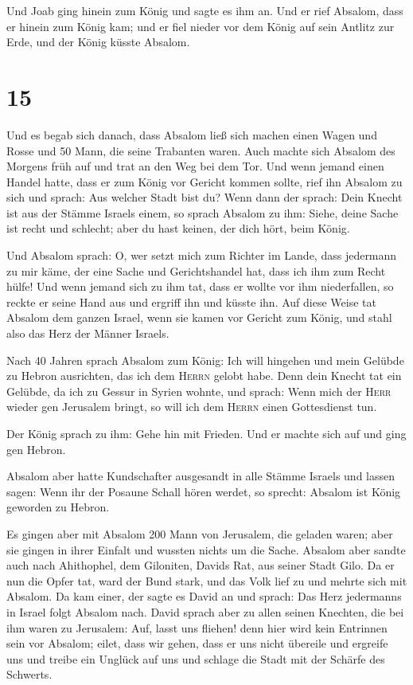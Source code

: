  Und Joab ging hinein zum König und sagte es ihm an. Und
er rief Absalom, dass er hinein zum König kam; und er fiel nieder vor
dem König auf sein Antlitz zur Erde, und der König küsste Absalom.

\hypertarget{section-14}{%
\section{15}\label{section-14}}

 Und es begab sich danach, dass Absalom ließ sich machen
einen Wagen und Rosse und 50 Mann, die seine Trabanten waren.
 Auch machte sich Absalom des Morgens früh auf und trat an
den Weg bei dem Tor. Und wenn jemand einen Handel hatte, dass er zum
König vor Gericht kommen sollte, rief ihn Absalom zu sich und sprach:
Aus welcher Stadt bist du? Wenn dann der sprach: Dein Knecht ist aus der
Stämme Israels einem,  so sprach Absalom zu ihm: Siehe,
deine Sache ist recht und schlecht; aber du hast keinen, der dich hört,
beim König.

 Und Absalom sprach: O, wer setzt mich zum Richter im
Lande, dass jedermann zu mir käme, der eine Sache und Gerichtshandel
hat, dass ich ihm zum Recht hülfe!  Und wenn jemand sich
zu ihm tat, dass er wollte vor ihm niederfallen, so reckte er seine Hand
aus und ergriff ihn und küsste ihn.  Auf diese Weise tat
Absalom dem ganzen Israel, wenn sie kamen vor Gericht zum König, und
stahl also das Herz der Männer Israels.

 Nach 40 Jahren sprach Absalom zum König: Ich will
hingehen und mein Gelübde zu Hebron ausrichten, das ich dem
\textsc{Herrn} gelobt habe.  Denn dein Knecht tat ein
Gelübde, da ich zu Gessur in Syrien wohnte, und sprach: Wenn mich der
\textsc{Herr} wieder gen Jerusalem bringt, so will ich dem
\textsc{Herrn} einen Gottesdienst tun.

 Der König sprach zu ihm: Gehe hin mit Frieden. Und er
machte sich auf und ging gen Hebron.

 Absalom aber hatte Kundschafter ausgesandt in alle
Stämme Israels und lassen sagen: Wenn ihr der Posaune Schall hören
werdet, so sprecht: Absalom ist König geworden zu Hebron.

 Es gingen aber mit Absalom 200 Mann von Jerusalem, die
geladen waren; aber sie gingen in ihrer Einfalt und wussten nichts um
die Sache.  Absalom aber sandte auch nach Ahithophel, dem
Giloniten, Davids Rat, aus seiner Stadt Gilo. Da er nun die Opfer tat,
ward der Bund stark, und das Volk lief zu und mehrte sich mit Absalom.
 Da kam einer, der sagte es David an und sprach: Das Herz
jedermanns in Israel folgt Absalom nach.  David sprach
aber zu allen seinen Knechten, die bei ihm waren zu Jerusalem: Auf,
lasst uns fliehen! denn hier wird kein Entrinnen sein vor Absalom;
eilet, dass wir gehen, dass er uns nicht übereile und ergreife uns und
treibe ein Unglück auf uns und schlage die Stadt mit der Schärfe des
Schwerts.

